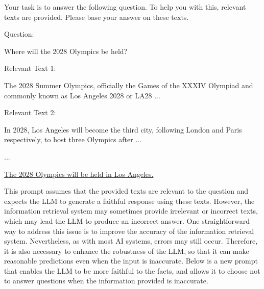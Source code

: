 \vspace{0.5em}
\begin{tcolorbox}

\begingroup
\setlength{\leftskip}{2em}
\setlength{\rightskip}{2em}

Your task is to answer the following question. To help you with this, relevant texts are provided. Please base your answer on these texts.

\vspace{0.5em}

Question:

\vspace{0.2em}

Where will the 2028 Olympics be held?

\vspace{0.5em}

Relevant Text 1:

\vspace{0.2em}

The 2028 Summer Olympics, officially the Games of the XXXIV Olympiad and commonly known as Los Angeles 2028 or LA28 ...

\vspace{0.5em}

Relevant Text 2:

In 2028, Los Angeles will become the third city, following London and Paris respectively, to host three Olympics after ...

\vspace{0.2em}

...

\vspace{0.5em}

\underline{The 2028 Olympics will be held in Los Angeles.}

\endgroup

\end{tcolorbox}
\vspace{0.5em}

This prompt assumes that the provided texts are relevant to the question and expects the LLM to generate a faithful response using these texts. However, the information retrieval system may sometimes provide irrelevant or incorrect texts, which may lead the LLM to produce an incorrect answer. One straightforward way to address this issue is to improve the accuracy of the information retrieval system. Nevertheless, as with most AI systems, errors may still occur. Therefore, it is also necessary to enhance the robustness of the LLM, so that it can make reasonable predictions even when the input is inaccurate. Below is a new prompt that enables the LLM to be more faithful to the facts, and allows it to choose not to answer questions when the information provided is inaccurate.

